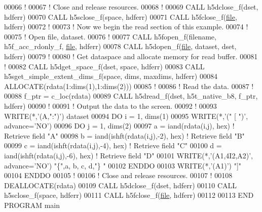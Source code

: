 \begin{DoxyCode}
00066   \textcolor{comment}{!}
00067   \textcolor{comment}{! Close and release resources.}
00068   \textcolor{comment}{!}
00069   \textcolor{keyword}{CALL }h5dclose\_f(dset, hdferr)
00070   \textcolor{keyword}{CALL }h5sclose\_f(space, hdferr)
00071   \textcolor{keyword}{CALL }h5fclose\_f(\hyperlink{structfile}{file}, hdferr)
00072   \textcolor{comment}{!}
00073   \textcolor{comment}{! Now we begin the read section of this example. }
00074   \textcolor{comment}{!}
00075   \textcolor{comment}{! Open file, dataset.}
00076   \textcolor{comment}{!}
00077   \textcolor{keyword}{CALL }h5fopen\_f(filename, h5f\_acc\_rdonly\_f, \hyperlink{structfile}{file}, hdferr)
00078   \textcolor{keyword}{CALL }h5dopen\_f(\hyperlink{structfile}{file}, dataset, dset, hdferr)
00079   \textcolor{comment}{!}
00080   \textcolor{comment}{! Get dataspace and allocate memory for read buffer.}
00081   \textcolor{comment}{!}
00082   \textcolor{keyword}{CALL }h5dget\_space\_f(dset, space, hdferr)
00083   \textcolor{keyword}{CALL }h5sget\_simple\_extent\_dims\_f(space, dims, maxdims, hdferr)
00084   \textcolor{keyword}{ALLOCATE}(rdata(1:dims(1),1:dims(2)))
00085   \textcolor{comment}{!}
00086   \textcolor{comment}{! Read the data.}
00087   \textcolor{comment}{!}
00088   f\_ptr = c\_loc(rdata)
00089   \textcolor{keyword}{CALL }h5dread\_f(dset,  h5t\_native\_b8, f\_ptr, hdferr)
00090   \textcolor{comment}{!}
00091   \textcolor{comment}{! Output the data to the screen.}
00092   \textcolor{comment}{!}
00093   \textcolor{keyword}{WRITE}(*,\textcolor{stringliteral}{'(A,":")'}) dataset
00094   \textcolor{keywordflow}{DO} i = 1, dims(1)
00095      \textcolor{keyword}{WRITE}(*,\textcolor{stringliteral}{'(" [ ")'}, advance=\textcolor{stringliteral}{'NO'})
00096      \textcolor{keywordflow}{DO} j = 1, dims(2)
00097         a = iand(rdata(i,j), hex) \textcolor{comment}{! Retrieve field "A"}
00098         b = iand(ishft(rdata(i,j),-2), hex) \textcolor{comment}{! Retrieve field "B"}
00099         c = iand(ishft(rdata(i,j),-4), hex) \textcolor{comment}{! Retrieve field "C"}
00100         d = iand(ishft(rdata(i,j),-6), hex) \textcolor{comment}{! Retrieve field "D"}
00101         \textcolor{keyword}{WRITE}(*,\textcolor{stringliteral}{'(A1,4I2,A2)'}, advance=\textcolor{stringliteral}{'NO'}) \textcolor{stringliteral}{"\{"},a, b, c, d,\textcolor{stringliteral}{"\} "}
00102 \textcolor{keywordflow}{     ENDDO}
00103      \textcolor{keyword}{WRITE}(*,\textcolor{stringliteral}{'(A1)'}) \textcolor{stringliteral}{"]"}
00104 \textcolor{keywordflow}{  ENDDO}
00105   \textcolor{comment}{!}
00106   \textcolor{comment}{! Close and release resources.}
00107   \textcolor{comment}{!}
00108   \textcolor{keyword}{DEALLOCATE}(rdata)
00109   \textcolor{keyword}{CALL }h5dclose\_f(dset, hdferr)
00110   \textcolor{keyword}{CALL }h5sclose\_f(space, hdferr)
00111   \textcolor{keyword}{CALL }h5fclose\_f(\hyperlink{structfile}{file}, hdferr)
00112 
00113 \textcolor{keyword}{END PROGRAM }main
\end{DoxyCode}
